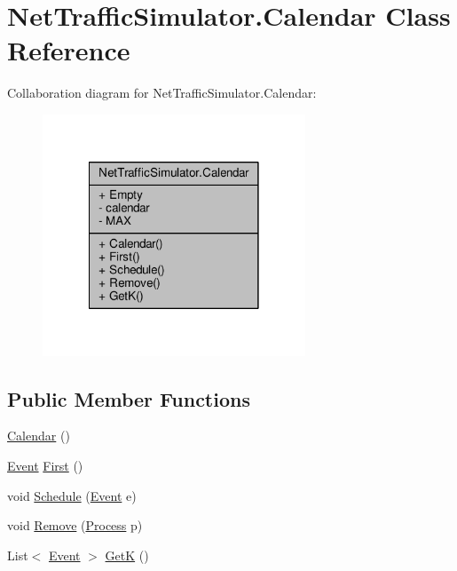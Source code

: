 \hypertarget{classNetTrafficSimulator_1_1Calendar}{\section{Net\-Traffic\-Simulator.\-Calendar Class Reference}
\label{classNetTrafficSimulator_1_1Calendar}
}


Collaboration diagram for Net\-Traffic\-Simulator.\-Calendar\-:
\nopagebreak
\begin{figure}[H]
\begin{center}
\leavevmode
\includegraphics[width=222pt]{classNetTrafficSimulator_1_1Calendar__coll__graph}
\end{center}
\end{figure}
\subsection*{Public Member Functions}
\begin{DoxyCompactItemize}
\item 
\hyperlink{classNetTrafficSimulator_1_1Calendar_a2c53afc1bea2464aea6688e7736a949b}{Calendar} ()
\item 
\hyperlink{classNetTrafficSimulator_1_1Event}{Event} \hyperlink{classNetTrafficSimulator_1_1Calendar_a7cf060fb0d78e3617b3a032b59149c77}{First} ()
\item 
void \hyperlink{classNetTrafficSimulator_1_1Calendar_ac180e0bcd27caf7145a691ef892c391d}{Schedule} (\hyperlink{classNetTrafficSimulator_1_1Event}{Event} e)
\item 
void \hyperlink{classNetTrafficSimulator_1_1Calendar_a6c0f684889e4bd772d1c25d8f479bcf4}{Remove} (\hyperlink{classNetTrafficSimulator_1_1Process}{Process} p)
\item 
List$<$ \hyperlink{classNetTrafficSimulator_1_1Event}{Event} $>$ \hyperlink{classNetTrafficSimulator_1_1Calendar_a52f67ad4336938832346f4272472465c}{Get\-K} ()
\end{DoxyCompactItemize}
